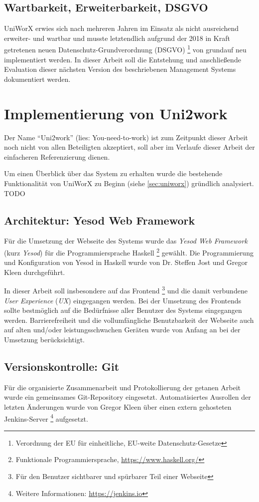 \documentclass[11pt,a4paper,twoside,ngerman]{article}
\begin{document}
\subsection{Wartbarkeit, Erweiterbarkeit, DSGVO}
UniWorX erwies sich nach mehreren Jahren im Einsatz als nicht ausreichend erweiter- und wartbar und musste letztendlich aufgrund der 2018 in Kraft getretenen neuen Datenschutz-Grundverordnung (DSGVO) \footnote{Verordnung der EU für einheitliche, EU-weite Datenschutz-Gesetze} von grundauf neu implementiert werden.
In dieser Arbeit soll die Entstehung und anschließende Evaluation dieser nächsten Version des beschriebenen Management Systems dokumentiert werden.

\cleardoublepage %
\section{Implementierung von Uni2work} \label{sec:implementation}
Der Name "`Uni2work"' (lies: You-need-to-work) ist zum Zeitpunkt dieser Arbeit noch nicht von allen Beteiligten akzeptiert, soll aber im Verlaufe dieser Arbeit der einfacheren Referenzierung dienen.

Um einen Überblick über das System zu erhalten wurde die bestehende Funktionalität von UniWorX zu Beginn (siehe \autoref{sec:uniworx}) gründlich analysiert. TODO

\subsection{Architektur: Yesod Web Framework}
Für die Umsetzung der Webseite des Systems wurde das \emph{Yesod Web Framework} (kurz \emph{Yesod}) für die Programmiersprache Haskell \footnote{Funktionale Programmiersprache, \url{https://www.haskell.org/}} gewählt. Die Programmierung und Konfiguration von Yesod in Haskell wurde von Dr. Steffen Jost und Gregor Kleen durchgeführt.

In dieser Arbeit soll insbesondere auf das Frontend \footnote{Für den Benutzer sichtbarer und spürbarer Teil einer Webseite} und die damit verbundene \emph{User Experience} (\emph{UX}) eingegangen werden. Bei der Umsetzung des Frontends sollte bestmöglich auf die Bedürfnisse aller Benutzer des Systems eingegangen werden. Barrierefreiheit und die vollumfängliche Benutzbarkeit der Webseite auch auf alten und/oder leistungsschwachen Geräten wurde von Anfang an bei der Umsetzung berücksichtigt.

\subsection{Versionskontrolle: Git}
Für die organisierte Zusammenarbeit und Protokollierung der getanen Arbeit wurde ein gemeinsames Git-Repository eingesetzt. Automatisiertes Ausrollen der letzten Änderungen wurde von Gregor Kleen über einen extern gehosteten Jenkins-Server \footnote{Weitere Informationen: \url{https://jenkins.io}} aufgesetzt.
\end{document}
